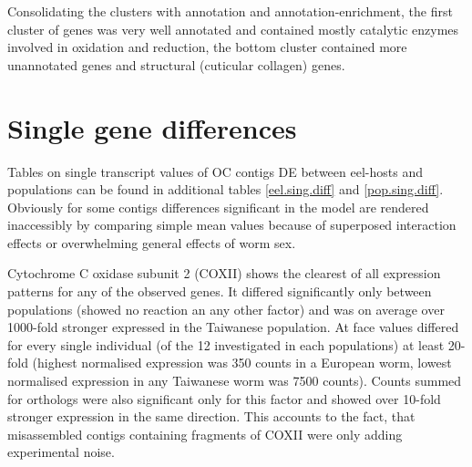 Consolidating the clusters with annotation and annotation-enrichment,
the first cluster of genes was very well annotated and contained
mostly catalytic enzymes involved in oxidation and reduction, the
bottom cluster contained more unannotated genes and structural
(cuticular collagen) genes.

\section{Single gene differences}
\label{sec:single-gene-diff}

Tables on single transcript values of OC contigs DE between eel-hosts
and populations can be found in additional tables \ref{eel.sing.diff}
and \ref{pop.sing.diff}. Obviously for some contigs differences
significant in the model are rendered inaccessibly by comparing simple
mean values because of superposed interaction effects or overwhelming
general effects of worm sex.

Cytochrome C oxidase subunit 2 (COXII) shows the clearest of all
expression patterns for any of the observed genes. It differed
significantly only between populations (showed no reaction an any
other factor) and was on average over 1000-fold stronger expressed in
the Taiwanese population. At face values differed for every single
individual (of the 12 investigated in each populations) at least
20-fold (highest normalised expression was 350 counts in a European
worm, lowest normalised expression in any Taiwanese worm was 7500
counts). Counts summed for orthologs were also significant only for
this factor and showed over 10-fold stronger expression in the same
direction. This accounts to the fact, that misassembled contigs
containing fragments of COXII were only adding experimental noise.






